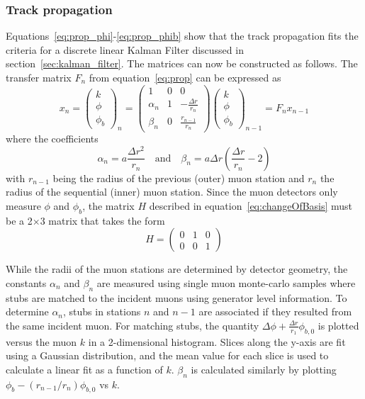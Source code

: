 \subsubsection{Track propagation}\label{sec:kbmtf_prop}
Equations~\ref{eq:prop_phi}-\ref{eq:prop_phib} show that the track propagation fits the criteria for a discrete linear Kalman Filter discussed in section~\ref{sec:kalman_filter}. The matrices can now be constructed as follows. The transfer matrix $F_n$ from equation~\ref{eq:prop} can be expressed as
\begin{equation}
	\label{eq:kmtfProp}
	x_{n}=\left(\begin{matrix}
		k\\
		\phi\\
		\phi_b
	\end{matrix}\right)_{n} = 
\left(\begin{matrix}
	1 & 0 & 0\\
	\alpha_n & 1 & -\frac{\Delta r}{r_n}\\
	\beta_n & 0 & \frac{r_{n-1}}{r_n}
\end{matrix}\right)
\left(\begin{matrix}
	k\\
	\phi\\
	\phi_b
\end{matrix}\right)_{n-1}=F_nx_{n-1}
\end{equation}
where the coefficients
\begin{equation}
	\label{eq:kmtf_coeff}
	\alpha_n=a\frac{\Delta r^2}{r_n} \quad \mathrm{and} \quad \beta_n=a\Delta r\left(\frac{\Delta r}{r_n}-2\right)
\end{equation}
with $r_{n-1}$ being the radius of the previous (outer) muon station and $r_n$ the radius of the sequential (inner) muon station. Since the muon detectors only measure $\phi$ and $\phi_b$, the matrix $H$ described in equation~\ref{eq:changeOfBasis} must be a 2$\times$3 matrix that takes the form
\begin{equation}
	H=\left(\begin{matrix}
		0 & 1 & 0\\
		0 & 0 & 1\end{matrix}\right)
\end{equation}

While the radii of the muon stations are determined by detector geometry, the constants $\alpha_n$ and $\beta_n$ are measured using single muon monte-carlo samples where stubs are matched to the incident muons using generator level information. To determine $\alpha_n$, stubs in stations $n$ and $n-1$ are associated if they resulted from the same incident muon. For matching stubs, the quantity $\Delta\phi+\frac{\Delta r}{r_1}\phi_{b,0}$ is plotted versus the muon $k$ in a 2-dimensional histogram. Slices along the y-axis are fit using a Gaussian distribution, and the mean value for each slice is used to calculate a linear fit as a function of $k$. $\beta_n$ is calculated similarly by plotting $\phi_b-\left(r_{n-1}/r_n\right)\phi_{b,0}$ vs $k$.

